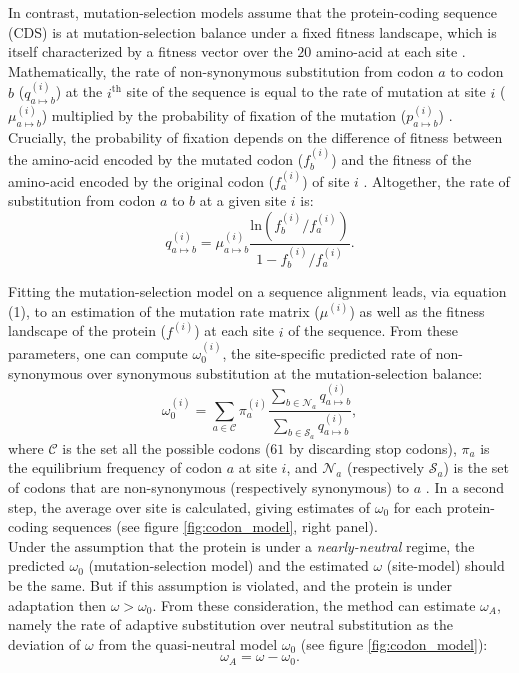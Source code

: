 \documentclass[10pt]{article}
\begin{document}
\begin{multicols}{2}
	In contrast, mutation-selection models assume that the protein-coding sequence (CDS) is at mutation-selection balance under a fixed fitness landscape, which is itself characterized by a fitness vector over the $20$ amino-acid at each site \cite{Yang2008, Halpern1998, Rodrigue2010}. Mathematically, the rate of non-synonymous substitution from codon $a$ to codon $b$ ($q_{a \mapsto b}^{(i)}$) at the $i^{\mathrm{th}}$ site of the sequence is equal to the rate of mutation at site $i$ ($\mu_{a \mapsto b}^{(i)}$) multiplied by the probability of fixation of the mutation ($p_{a \mapsto b}^{(i)}$) \cite{kimura_neutral_1983}. Crucially, the probability of fixation depends on the difference of fitness between the amino-acid encoded by the mutated codon ($f_b^{(i)}$) and the fitness of the amino-acid encoded by the original codon ($f_a^{(i)}$) of site $i$ \cite{wright_evolution_1931, fisher_genetical_1930}. Altogether, the rate of substitution from codon $a$ to $b$ at a given site $i$ is:
	\begin{equation}
		q_{a \mapsto b}^{(i)} = \mu_{a \mapsto b}^{(i)} \dfrac{\mathrm{ln}(f_b^{(i)} / f_a^{(i)})}{1 - f_b^{(i)} / f_a^{(i)}}.
	\end{equation}
	
	Fitting the mutation-selection model on a sequence alignment leads, via equation (1), to an estimation of the mutation rate matrix ($\mu^{(i)}$) as well as the fitness landscape of the protein ($f^{(i)}$) at each site $i$ of the sequence. From these parameters, one can compute $\omega_{0}^{(i)}$, the site-specific predicted rate of non-synonymous over synonymous substitution at the mutation-selection balance: 
	\begin{equation}
	\omega_{0}^{(i)} = \sum_{a \in  \mathcal{C}} \pi_a^{(i)}  \dfrac{\sum_{b \in  \mathcal{N}_a} q_{a \mapsto b}^{(i)}}{\sum_{b \in \mathcal{S}_a} q_{a \mapsto b}^{(i)}},
	\end{equation}
	where $\mathcal{C}$ is the set all the possible codons ($61$ by discarding stop codons), $\pi_a$ is the equilibrium frequency of codon $a$ at site $i$, and $\mathcal{N}_a$ (respectively $\mathcal{S}_a$) is the set of codons that are non-synonymous (respectively synonymous) to $a$  \cite{spielman_relationship_2015, rodrigue_site-heterogeneous_2014}. In a second step, the average over site is calculated, giving estimates of $\omega_0$ for each protein-coding sequences (see figure \ref{fig:codon_model}, right panel). \\
	
	Under the assumption that the protein is under a \textit{nearly-neutral} regime,  the predicted $\omega_0$ (mutation-selection model) and the estimated $\omega$ (site-model) should be the same. But if this assumption is violated, and the protein is under adaptation then $\omega > \omega_0$.
	From these consideration, the method can estimate $\omega_A$, namely the rate of adaptive substitution over neutral substitution as the deviation of $\omega$ from the quasi-neutral model $\omega_0$ (see figure \ref{fig:codon_model}):
	\begin{equation}
		\omega_A = \omega - \omega_0.
	\end{equation}
	

\end{multicols}
\end{document}
